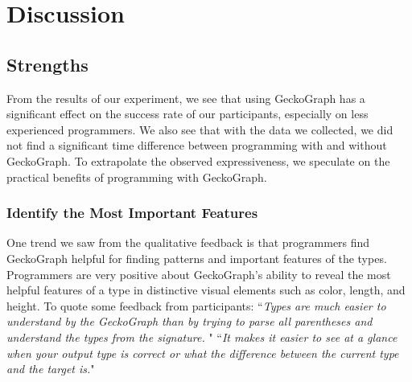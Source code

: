 \documentclass[preprint,12pt]{elsarticle}
\begin{document}
\section{Discussion} \label{sec:discussion}
\subsection{Strengths}
From the results of our experiment, we see that using GeckoGraph has a significant effect on the success rate of our participants, especially on less experienced programmers. We also see that with the data we collected, we did not find a significant time difference between programming with and without GeckoGraph. To extrapolate the observed expressiveness, we speculate on the practical benefits of programming with GeckoGraph.

\subsubsection{Identify the Most Important Features}
One trend we saw from the qualitative feedback is that programmers find GeckoGraph helpful for finding patterns and important features of the types. Programmers are very positive about GeckoGraph's ability to reveal the most helpful features of a type in distinctive visual elements such as color, length, and height.
To quote some feedback from participants: ``{\it Types are much easier to understand by the GeckoGraph than by trying to parse all parentheses and understand the types from the signature.} " ``{\it It makes it easier to see at a glance when your output type is correct or what the difference between the current type and the target is.}"
\end{document}
